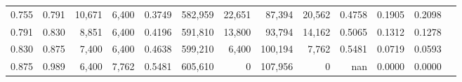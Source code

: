 \begin{tabular}{rrrrrrrrrrrrr}
0.755 & 0.791 &  10,671 & 6,400 &                                     0.3749 & 582,959 &  22,651 &  87,394 &  20,562 & 0.4758 & 0.1905 & 0.2098 \\
0.791 & 0.830 &   8,851 & 6,400 &                                     0.4196 & 591,810 &  13,800 &  93,794 &  14,162 & 0.5065 & 0.1312 & 0.1278 \\
0.830 & 0.875 &   7,400 & 6,400 &                                     0.4638 & 599,210 &   6,400 & 100,194 &   7,762 & 0.5481 & 0.0719 & 0.0593 \\
0.875 & 0.989 &   6,400 & 7,762 &                                     0.5481 & 605,610 &       0 & 107,956 &       0 &    nan & 0.0000 & 0.0000 \\
\bottomrule
\end{tabular}
